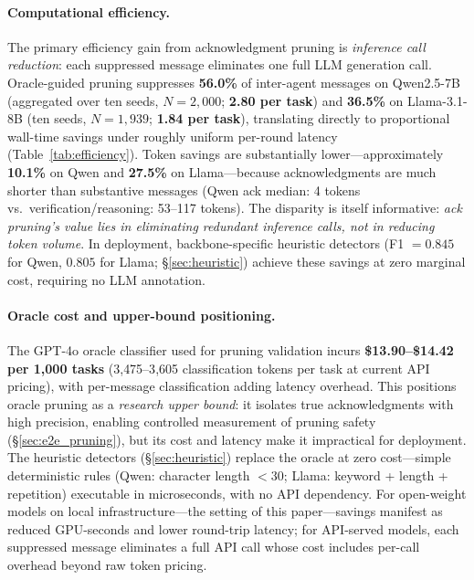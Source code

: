 
\paragraph{Computational efficiency.}
The primary efficiency gain from acknowledgment pruning is \emph{inference call reduction}: each suppressed message eliminates one full LLM generation call.
Oracle-guided pruning suppresses \textbf{56.0\%} of inter-agent messages on Qwen2.5-7B (aggregated over ten seeds, $N{=}2{,}000$; \textbf{2.80 per task}) and \textbf{36.5\%} on Llama-3.1-8B (ten seeds, $N{=}1{,}939$; \textbf{1.84 per task}), translating directly to proportional wall-time savings under roughly uniform per-round latency (Table~\ref{tab:efficiency}).
Token savings are substantially lower---approximately \textbf{10.1\%} on Qwen and \textbf{27.5\%} on Llama---because acknowledgments are much shorter than substantive messages (Qwen ack median: 4 tokens vs.\ verification/reasoning: 53--117 tokens).
The disparity is itself informative: \emph{ack pruning's value lies in eliminating redundant inference calls, not in reducing token volume}.
In deployment, backbone-specific heuristic detectors (F1 $= 0.845$ for Qwen, $0.805$ for Llama; \S\ref{sec:heuristic}) achieve these savings at zero marginal cost, requiring no LLM annotation.

\paragraph{Oracle cost and upper-bound positioning.}
The GPT-4o oracle classifier used for pruning validation incurs \textbf{\$13.90--\$14.42 per 1{,}000 tasks} (3{,}475--3{,}605 classification tokens per task at current API pricing), with per-message classification adding latency overhead.
This positions oracle pruning as a \emph{research upper bound}: it isolates true acknowledgments with high precision, enabling controlled measurement of pruning safety (\S\ref{sec:e2e_pruning}), but its cost and latency make it impractical for deployment.
The heuristic detectors (\S\ref{sec:heuristic}) replace the oracle at zero cost---simple deterministic rules (Qwen: character length $< 30$; Llama: keyword + length + repetition) executable in microseconds, with no API dependency.
For open-weight models on local infrastructure---the setting of this paper---savings manifest as reduced GPU-seconds and lower round-trip latency; for API-served models, each suppressed message eliminates a full API call whose cost includes per-call overhead beyond raw token pricing.

